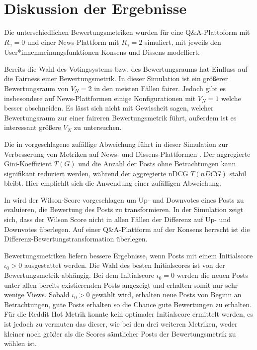 \chapter{Diskussion der Ergebnisse}

Die unterschiedlichen Bewertungsmetriken wurden für eine Q\&A-Plattoform mit $R_\gamma = 0$ und einer News-Plattform mit $R_\gamma = 2$ simuliert, mit jeweils den User*innenmeinungsfunktionen Konsens und Dissens modelliert.

Bereits die Wahl des Votingsystems bzw. des Bewertungsraums hat Einfluss auf die Fairness einer Bewertungsmetrik. In dieser Simulation ist ein größerer Bewertungsraum von $V_N = 2$ in den meisten Fällen fairer. Jedoch gibt es insbesondere auf News-Plattformen einige Konfigurationen mit $V_N = 1$ welche besser abschneiden. Es lässt sich nicht mit Gewissheit sagen, welcher Bewertungsraum zur einer faireren Bewertungsmetrik führt, außerdem ist es interessant größere $V_N$ zu untersuchen.

Die in \cite{Luu} vorgeschlagene zufällige Abweichung führt in dieser Simulation zur Verbesserung von Metriken auf News- und Dissens-Plattformen . Der aggregierte Gini-Koeffizient $T(G)$ und die Anzahl der Posts ohne Betrachtungen kann signifikant reduziert werden, während der aggregierte nDCG $T(nDCG)$ stabil bleibt. Hier empfiehlt sich die Anwendung einer zufälligen Abweichung. 

In \cite{miller} wird der Wilson-Score vorgeschlagen um Up- und Downvotes eines Posts zu evaluieren, die Bewertung des Posts zu transformieren. In der Simulation zeigt sich, dass der Wilson Score nicht in allen Fällen der Differenz auf Up- und Downvotes überlegen. Auf einer Q\&A-Plattform auf der Konsens herrscht ist die Differenz-Bewertungstransformation überlegen.

Bewertungsmetriken liefern bessere Ergebnisse, wenn Posts mit einem Initialscore $\iota_0 > 0$ ausgestattet werden. Die Wahl des besten Initialscores ist von der Bewertungsmetrik abhängig. Bei dem Initialscore $\iota_0 = 0$ werden die neuen Posts unter allen bereits existierenden Posts angezeigt und erhalten somit nur sehr wenige Views. Sobald $\iota_0 > 0$ gewählt wird, erhalten neue Posts von Beginn an Betrachtungen, gute Posts erhalten so die Chance gute Bewertungen zu erhalten.
Für die Reddit Hot Metrik konnte kein optimaler Initialscore ermittelt werden, es ist jedoch zu vermuten das dieser, wie bei den drei weiteren Metriken, weder kleiner noch größer als die Scores sämtlicher Posts der Bewertungsmetrik zu wählen ist.

